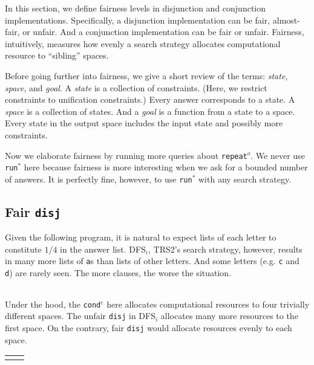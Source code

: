 \documentclass[acmlarge]{acmart}
\newcommand{\conde}{\texttt{cond$^e$}}
\newcommand{\conj}{\texttt{conj}}
\newcommand{\disj}{\texttt{disj}}
\newcommand{\repeato}{\texttt{repeat$^o$}}
\newcommand{\runstar}{\texttt{run$^*$}}
\newcommand{\DFSi }[0]{DFS$_{i}$}
\begin{document}
In this section, we define fairness levels in disjunction and conjunction
implementations. Specifically, a disjunction implementation can be
fair, almost-fair, or unfair. And a conjunction implementation can be
fair or unfair. Fairness, intuitively, measures how evenly a search strategy 
allocates computational resource to ``sibling'' spaces.

Before going further into fairness, we give a short review of the terms:
\emph{state}, \emph{space}, and \emph{goal}.
A \emph{state} is a collection of constraints. (Here, we restrict 
constraints to unification constraints.) Every answer corresponds to a 
state. A \emph{space} is a collection of states. And a \emph{goal} is a 
function from a state to a space.
Every state in the output space includes the input state and possibly more 
constraints.

Now we elaborate fairness by running more queries about \repeato{}. We never 
use \runstar{} here because fairness is more interesting when we 
ask for a bounded number of answers. It is perfectly fine, however, to use 
\runstar{} with any search strategy.

\subsection{Fair \texttt{disj}}

Given the following program, it is natural to expect lists of each
letter to constitute $1/4$ in the answer list. \DFSi, TRS2's search
strategy, however, results in many more lists of \texttt{a}s than
lists of other letters. And some letters (e.g. \texttt{c} and
\texttt{d}) are rarely seen. The more clauses, the worse the situation.

\begin{center}
	\begin{tabular}{c}
		
	\end{tabular}
\end{center}

Under the hood, the \conde{} here allocates computational resources to 
four trivially different spaces. The unfair \disj{} in 
\DFSi{} allocates many more resources to the first space. On the 
contrary, fair \disj{} would allocate resources evenly to each space. 

\begin{center}
	\begin{tabular}{l|r}
		 &
		
	\end{tabular}
\end{center}
\end{document}
